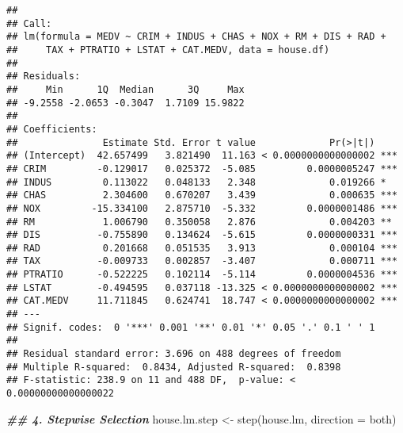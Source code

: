 \documentclass[
]{article}
\newenvironment{Shaded}{\begin{snugshade}}{\end{snugshade}}
\newcommand{\AttributeTok}[1]{\textcolor[rgb]{0.77,0.63,0.00}{#1}}
\newcommand{\DocumentationTok}[1]{\textcolor[rgb]{0.56,0.35,0.01}{\textbf{\textit{#1}}}}
\newcommand{\FunctionTok}[1]{\textcolor[rgb]{0.00,0.00,0.00}{#1}}
\newcommand{\NormalTok}[1]{#1}
\newcommand{\OtherTok}[1]{\textcolor[rgb]{0.56,0.35,0.01}{#1}}
\newcommand{\StringTok}[1]{\textcolor[rgb]{0.31,0.60,0.02}{#1}}
\begin{document}
\begin{verbatim}
## 
## Call:
## lm(formula = MEDV ~ CRIM + INDUS + CHAS + NOX + RM + DIS + RAD + 
##     TAX + PTRATIO + LSTAT + CAT.MEDV, data = house.df)
## 
## Residuals:
##     Min      1Q  Median      3Q     Max 
## -9.2558 -2.0653 -0.3047  1.7109 15.9822 
## 
## Coefficients:
##               Estimate Std. Error t value             Pr(>|t|)    
## (Intercept)  42.657499   3.821490  11.163 < 0.0000000000000002 ***
## CRIM         -0.129017   0.025372  -5.085         0.0000005247 ***
## INDUS         0.113022   0.048133   2.348             0.019266 *  
## CHAS          2.304600   0.670207   3.439             0.000635 ***
## NOX         -15.334100   2.875710  -5.332         0.0000001486 ***
## RM            1.006790   0.350058   2.876             0.004203 ** 
## DIS          -0.755890   0.134624  -5.615         0.0000000331 ***
## RAD           0.201668   0.051535   3.913             0.000104 ***
## TAX          -0.009733   0.002857  -3.407             0.000711 ***
## PTRATIO      -0.522225   0.102114  -5.114         0.0000004536 ***
## LSTAT        -0.494595   0.037118 -13.325 < 0.0000000000000002 ***
## CAT.MEDV     11.711845   0.624741  18.747 < 0.0000000000000002 ***
## ---
## Signif. codes:  0 '***' 0.001 '**' 0.01 '*' 0.05 '.' 0.1 ' ' 1
## 
## Residual standard error: 3.696 on 488 degrees of freedom
## Multiple R-squared:  0.8434, Adjusted R-squared:  0.8398 
## F-statistic: 238.9 on 11 and 488 DF,  p-value: < 0.00000000000000022
\end{verbatim}

\begin{Shaded}
\begin{Highlighting}[]
\DocumentationTok{\#\# 4. Stepwise Selection}
\NormalTok{house.lm.step }\OtherTok{\textless{}{-}} \FunctionTok{step}\NormalTok{(house.lm, }\AttributeTok{direction =} \StringTok{\textquotesingle{}both\textquotesingle{}}\NormalTok{)}
\end{Highlighting}
\end{Shaded}
\end{document}

